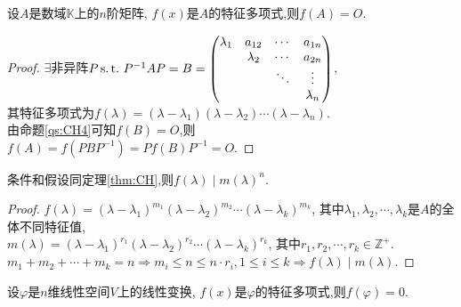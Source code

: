 \begin{theorem}\label{thm:CH}
  设$A$是数域$\mathbb{K}$上的$n$阶矩阵, $f(x)$是$A$的特征多项式,则$f(A)=O$.
\end{theorem}
\begin{proof}
  $\exists$非异阵$P\operatorname{s.t.{}} P^{-1}AP=B=
  \begin{pmatrix}
    \lambda_1 & a_{12} & \cdots & a_{1n}\\
              &\lambda_2&\cdots&a_{2n}\\
              &&\ddots&\vdots\\
    &&&\lambda_n
  \end{pmatrix}$,\\
  其特征多项式为$f(\lambda)=(\lambda-\lambda_1)(\lambda-\lambda_2)\cdots(\lambda-\lambda_n)$.\\
  由命题\eqref{qs:CH4}可知$f(B)=O$,则\\
  $f(A)=f(PBP^{-1})=Pf(B)P^{-1}=O$.
\end{proof}
\begin{deduction}
  条件和假设同定理\eqref{thm:CH},则$f(\lambda)\mid m(\lambda)^n$.
\end{deduction}
\begin{proof}
  $f(\lambda)=(\lambda-\lambda_1)^{m_1}(\lambda-\lambda_2)^{m_2}\cdots(\lambda-\lambda_k)^{m_k}$,
  其中$\lambda_1,\lambda_2,\cdots,\lambda_k$是$A$的全体不同特征值,\\
  $m(\lambda)=(\lambda-\lambda_1)^{r_1}(\lambda-\lambda_2)^{r_2}\cdots(\lambda-\lambda_k)^{r_k}$,
  其中$r_1,r_2,\cdots,r_k \in \mathbb{Z}^+$.\\
  $m_1+m_2+\cdots+m_k=n \Longrightarrow m_i \leq n \leq n\cdot r_i, 1 \leq i \leq k \Longrightarrow f(\lambda)\mid m(\lambda)$.
\end{proof}
\begin{deduction}
  设$\varphi$是$n$维线性空间$V$上的线性变换, $f(x)$是$\varphi$的特征多项式,则$f(\varphi)=0$.
\end{deduction}
